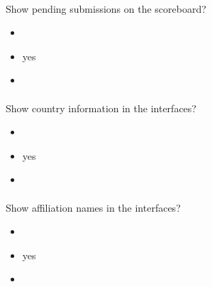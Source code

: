 \documentclass[a4paper,10pt,english,openany]{sphinxmanual}
\begin{document}
\paragraph{}
\label{\detokenize{configuration-reference:show-pending}}
\sphinxAtStartPar
Show pending submissions on the scoreboard?
\begin{itemize}
\item {} 
\sphinxAtStartPar
{} 

\item {} 
\sphinxAtStartPar
{} yes

\item {} 
\sphinxAtStartPar
{} 

\end{itemize}


\paragraph{}
\label{\detokenize{configuration-reference:show-flags}}
\sphinxAtStartPar
Show country information in the interfaces?
\begin{itemize}
\item {} 
\sphinxAtStartPar
{} 

\item {} 
\sphinxAtStartPar
{} yes

\item {} 
\sphinxAtStartPar
{} 

\end{itemize}


\paragraph{}
\label{\detokenize{configuration-reference:show-affiliations}}
\sphinxAtStartPar
Show affiliation names in the interfaces?
\begin{itemize}
\item {} 
\sphinxAtStartPar
{} 

\item {} 
\sphinxAtStartPar
{} yes

\item {} 
\sphinxAtStartPar
{} 

\end{itemize}
\end{document}
